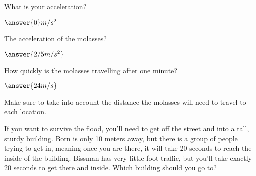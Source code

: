 \documentclass{ximera}
\begin{document}
\begin{question}
What is your acceleration?

$\answer{0}m/s^2$

The acceleration of the molasses?

$\answer{2/5 m/s^2}$
\end{question}
\begin{question}
How quickly is the molasses travelling after one minute?

$\answer{24m/s}$
\end{question}
\begin{question}
\begin{hint}
Make sure to take into account the distance the molasses will need to travel to each location.
\end{hint}If you want to survive the flood, you'll need to get off the street and into a tall, sturdy building. Born is only 10 meters away, but there is a group of people trying to get in, meaning once you are there, it will take 20 seconds to reach the inside of the building. Bissman has very little foot traffic, but you'll take exactly 20 seconds to get there and inside. Which building should you go to? \begin{multipleChoice}
\end{multipleChoice}\end{question}

\setcounter{problem}{0}
\end{document}
